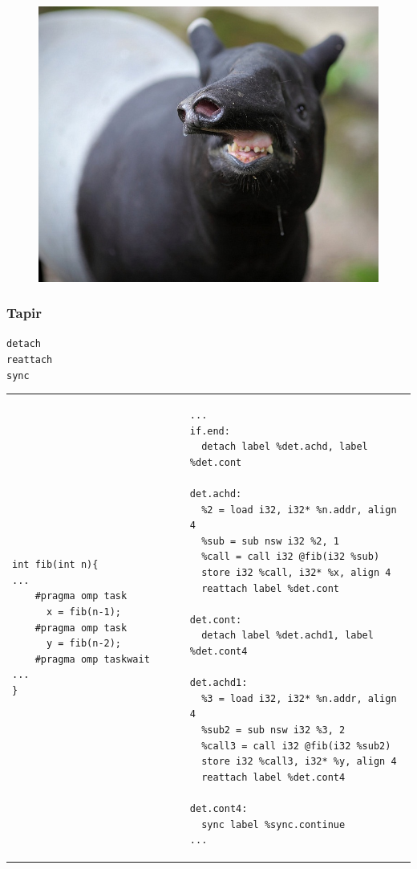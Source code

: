 \documentclass{beamer}
\begin{document}
\begin{frame}[fragile]
\begin{figure}
\includegraphics[width=0.8\linewidth]{tapir.jpg}
\end{figure}
\end{frame}

\begin{frame}[fragile]
\frametitle{Tapir}
\begin{center}
\huge{\texttt{detach \\ reattach \\ sync}}
\end{center}
\end{frame}

\begin{frame}[fragile]
\begin{tabular*}{\linewidth}{ll}
\begin{minipage}[T]{0.4\linewidth}
\begin{verbatim}
int fib(int n){                   
...
    #pragma omp task
      x = fib(n-1);  
    #pragma omp task
      y = fib(n-2); 
    #pragma omp taskwait
...
}
\end{verbatim}
\end{minipage}
  &
\begin{minipage}[T]{0.6\linewidth}
{\scriptsize
\begin{verbatim}
...
if.end:
  detach label %det.achd, label %det.cont

det.achd:
  %2 = load i32, i32* %n.addr, align 4
  %sub = sub nsw i32 %2, 1
  %call = call i32 @fib(i32 %sub)
  store i32 %call, i32* %x, align 4
  reattach label %det.cont

det.cont:
  detach label %det.achd1, label %det.cont4

det.achd1:
  %3 = load i32, i32* %n.addr, align 4
  %sub2 = sub nsw i32 %3, 2
  %call3 = call i32 @fib(i32 %sub2)
  store i32 %call3, i32* %y, align 4
  reattach label %det.cont4

det.cont4:
  sync label %sync.continue
...
\end{verbatim}
}
\end{minipage}
\end{tabular*}
\end{frame}
\end{document}
